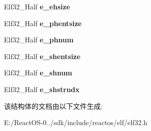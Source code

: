 \begin{DoxyCompactItemize}
Elf32\+\_\+\+Half {\bfseries e\+\_\+ehsize}
\item 
\mbox{\label{struct_elf32___ehdr_afa2289f96d86fcc568a3b1f40cc8953e}} 
Elf32\+\_\+\+Half {\bfseries e\+\_\+phentsize}
\item 
\mbox{\label{struct_elf32___ehdr_a360898812db1655f8cb8258780d9df5b}} 
Elf32\+\_\+\+Half {\bfseries e\+\_\+phnum}
\item 
\mbox{\label{struct_elf32___ehdr_ab53c709a841960e499da68e2316ed428}} 
Elf32\+\_\+\+Half {\bfseries e\+\_\+shentsize}
\item 
\mbox{\label{struct_elf32___ehdr_a11249bd7e61642742a68a3e7f69ac721}} 
Elf32\+\_\+\+Half {\bfseries e\+\_\+shnum}
\item 
\mbox{\label{struct_elf32___ehdr_a3b3070ccd7d971e8cb6ea58d4c6fab09}} 
Elf32\+\_\+\+Half {\bfseries e\+\_\+shstrndx}
\end{DoxyCompactItemize}


该结构体的文档由以下文件生成\+:\begin{DoxyCompactItemize}
\item 
E\+:/\+React\+O\+S-\/0../sdk/include/reactos/elf/elf32.\+h\end{DoxyCompactItemize}

